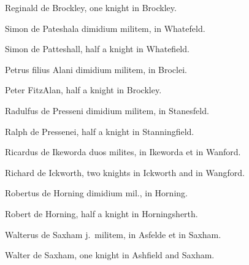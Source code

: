 \documentclass{book}
\begin{document}
\begin{paracol}{2}
Reginald de Brockley, one knight in Brockley.

\switchcolumn*

\begin{otherlanguage}{latin}
Simon de Pateshala dimidium militem, in Whatefeld.
\end{otherlanguage}

\switchcolumn

Simon de Patteshall, half a knight in Whatefield.

\switchcolumn*

\begin{otherlanguage}{latin}
Petrus filius Alani dimidium militem, in Broclei.
\end{otherlanguage}

\switchcolumn

Peter FitzAlan, half a knight in Brockley.

\switchcolumn*

\begin{otherlanguage}{latin}
Radulfus de Presseni dimidium militem, in Stanesfeld.
\end{otherlanguage}

\switchcolumn

Ralph de Pressenei, half a knight in Stanningfield.

\switchcolumn*

\begin{otherlanguage}{latin}
Ricardus de Ikeworda duos milites, in Ikeworda et in Wanford.
\end{otherlanguage}

\switchcolumn

Richard de Ickworth, two knights in Ickworth and in Wangford.

\switchcolumn*

\begin{otherlanguage}{latin}
Robertus de Horning dimidium mil., in Horning.
\end{otherlanguage}

\switchcolumn

Robert de Horning, half a knight in Horningsherth.

\switchcolumn*

\begin{otherlanguage}{latin}
Walterus de Saxham j.\ militem, in Asfelde et in Saxham.
\end{otherlanguage}

\switchcolumn

Walter de Saxham, one knight in Ashfield and Saxham.


\end{paracol}
\end{document}

